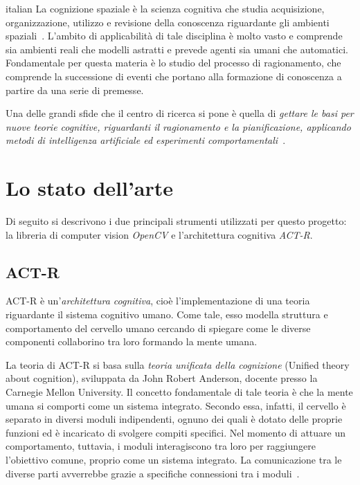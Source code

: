 \begin{otherlanguage*}{italian}
	La cognizione spaziale è la scienza cognitiva che studia acquisizione, organizzazione, utilizzo e revisione della conoscenza riguardante gli ambienti spaziali~\cite{r8Cspace}. L'ambito di applicabilità di tale disciplina è molto vasto e comprende sia ambienti reali che modelli astratti e prevede agenti sia umani che automatici.
	Fondamentale per questa materia è lo studio del processo di ragionamento, che comprende la successione di eventi che portano alla formazione di conoscenza a partire da una serie di premesse. 
	
	Una delle grandi sfide che il centro di ricerca si pone è quella di \emph{gettare le basi per nuove teorie cognitive, riguardanti il ragionamento e la pianificazione, applicando metodi di intelligenza artificiale ed esperimenti comportamentali~\cite{TesiEnr}}.

 

	\section*{Lo stato dell'arte}
	Di seguito si descrivono i due principali strumenti utilizzati per questo progetto: la libreria di computer vision \emph{\mbox{OpenCV}} e l'architettura cognitiva \mbox{\emph{ACT-R}}.
		
			\subsection*{ACT-R}
				\mbox{ACT-R} è un'\emph{architettura cognitiva}, cioè l'implementazione di una teoria riguardante il sistema cognitivo umano. Come tale, esso modella struttura e comportamento del cervello umano cercando di spiegare come le diverse componenti collaborino tra loro formando la mente umana.
				
				La teoria di \mbox{ACT-R} si basa sulla \emph{teoria unificata della cognizione} (Unified theory about cognition), sviluppata da John Robert Anderson, docente presso la Carnegie Mellon University. 
				Il concetto fondamentale di tale teoria è che la mente umana si comporti come un sistema integrato.
				Secondo essa, infatti, il cervello è separato in diversi moduli indipendenti, ognuno dei quali è dotato delle proprie funzioni ed è incaricato di svolgere compiti specifici.
				Nel momento di attuare un comportamento, tuttavia, i moduli interagiscono tra loro per raggiungere l'obiettivo comune, proprio come un sistema integrato. 
				La comunicazione tra le diverse parti avverrebbe grazie a specifiche connessioni tra i moduli~\cite{Anderson04anintegrated}.


\end{otherlanguage*}
